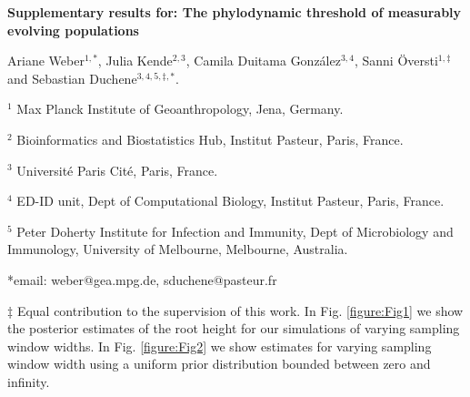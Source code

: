 \documentclass[11pt]{article}
\begin{document}
\begin{flushright}

\end{flushright}
\begin{center}
	\begin{LARGE}
	\textbf{Supplementary results for: The phylodynamic threshold of measurably evolving populations}
	\end{LARGE}


Ariane Weber$^{1,*}$, Julia Kende$^{2, 3}$, Camila Duitama González$^{3,4}$, Sanni Översti$^{1, \ddagger}$ and Sebastian Duchene$^{3,4, 5,\ddagger, *}$.
\end{center}

$^{1}$ Max Planck Institute of Geoanthropology, Jena, Germany.

$^{2}$ Bioinformatics and Biostatistics Hub, Institut Pasteur, Paris, France.

$^{3}$ Université Paris Cité, Paris, France.

$^{4}$ ED-ID unit, Dept of Computational Biology, Institut Pasteur, Paris, France.

$^{5}$ Peter Doherty Institute for Infection and Immunity, Dept of Microbiology and Immunology, University of Melbourne, Melbourne, Australia.


*email: weber@gea.mpg.de, sduchene@pasteur.fr

$\ddagger$ Equal contribution to the supervision of this work.
\newline
In Fig. \ref{figure:Fig1} we show the posterior estimates of the root height for our simulations of varying sampling window widths. In Fig. \ref{figure:Fig2} we show estimates for varying sampling window width using a uniform prior distribution bounded between zero and infinity.
\end{document}
